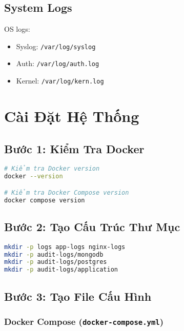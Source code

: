 \documentclass[a4paper,12pt]{article}
\begin{document}
\subsection{System Logs}
OS logs:
\begin{itemize}
    \item Syslog: \texttt{/var/log/syslog}
    \item Auth: \texttt{/var/log/auth.log}
    \item Kernel: \texttt{/var/log/kern.log}
\end{itemize}

\section{Cài Đặt Hệ Thống}

\subsection{Bước 1: Kiểm Tra Docker}

\begin{lstlisting}[language=bash]
# Kiểm tra Docker version
docker --version

# Kiểm tra Docker Compose version
docker compose version
\end{lstlisting}

\subsection{Bước 2: Tạo Cấu Trúc Thư Mục}

\begin{lstlisting}[language=bash]
mkdir -p logs app-logs nginx-logs
mkdir -p audit-logs/mongodb
mkdir -p audit-logs/postgres
mkdir -p audit-logs/application
\end{lstlisting}

\subsection{Bước 3: Tạo File Cấu Hình}

\subsubsection{Docker Compose (\texttt{docker-compose.yml})}
\end{document}
